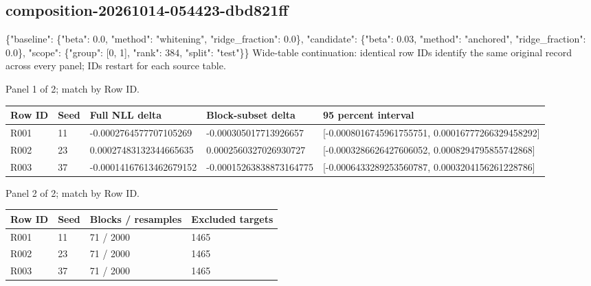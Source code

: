 \documentclass[10pt]{article}
\begin{document}
\subsection{composition-20261014-054423-dbd821ff}
\{"baseline": \{"beta": 0.0, "method": "whitening", "ridge\_fraction": 0.0\}, "candidate": \{"beta": 0.03, "method": "anchored", "ridge\_fraction": 0.0\}, "scope": \{"group": [0, 1], "rank": 384, "split": "test"\}\}
Wide-table continuation: identical row IDs identify the same original record across every panel; IDs restart for each source table.
\par\noindent Panel 1 of 2; match by Row ID.
{\scriptsize\setlength{\tabcolsep}{2pt}
\begin{longtable}{p{}p{}p{}p{}p{}}
Row ID & Seed & Full NLL delta & Block-subset delta & 95 percent interval \\
\hline\endhead
R001 & 11 & -0.0002764577707105269 & -0.000305017713926657 & [-0.0008016745961755751, 0.00016777266329458292] \\
R002 & 23 & 0.00027483132344665635 & 0.0002560327026930727 & [-0.0003286626427606052, 0.0008294795855742868] \\
R003 & 37 & -0.00014167613462679152 & -0.00015263838873164775 & [-0.0006433289253560787, 0.0003204156261228786] \\
\end{longtable}}
\par\noindent Panel 2 of 2; match by Row ID.
{\scriptsize\setlength{\tabcolsep}{2pt}
\begin{longtable}{p{}p{}p{}p{}}
Row ID & Seed & Blocks / resamples & Excluded targets \\
\hline\endhead
R001 & 11 & 71 / 2000 & 1465 \\
R002 & 23 & 71 / 2000 & 1465 \\
R003 & 37 & 71 / 2000 & 1465 \\
\end{longtable}}
\end{document}
